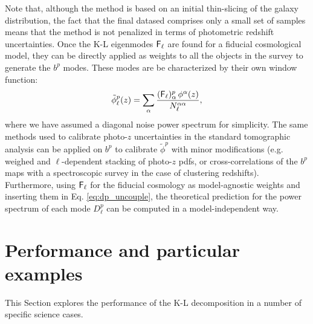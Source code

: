 \documentclass[twocolumn,amsfont,amssymb,amsmath, showpacs,balancelastpage, nofootinbib]{revtex4-1}
\begin{document}
    Note that, although the method is based on an initial thin-slicing of the galaxy distribution, the fact that the final datased comprises only a small set of samples means that the method is not penalized in terms of photometric redshift uncertainties. Once the K-L eigenmodes ${\sf F}_\ell$ are found for a fiducial cosmological model, they can be directly applied as weights to all the objects in the survey to generate the $b^p$ modes. These modes are be characterized by their own window function:
    \begin{equation}
     \tilde{\phi}_\ell^p(z)=\sum_\alpha \frac{({\sf F}_\ell)^p_\alpha\,\phi^\alpha(z)}{N^{\alpha\alpha}_\ell},
    \end{equation}
    where we have assumed a diagonal noise power spectrum for simplicity.
    The same methods used to calibrate photo-$z$ uncertainties in the standard tomographic analysis can be applied on $b^p$ to calibrate $\tilde{\phi}^p$ with minor modifications (e.g. weighed and $\ell$-dependent stacking of photo-$z$ pdfs, or cross-correlations of the $b^p$ maps with a spectroscopic survey in the case of clustering redshifts). Furthermore, using ${\sf F}_\ell$ for the fiducial cosmology as model-agnostic weights and inserting them in Eq. \ref{eq:dp_uncouple}, the theoretical prediction for the power spectrum of each mode $D^p_\ell$ can be computed in a model-independent way.

\section{Performance and particular examples}\label{sec:results}
  This Section explores the performance of the K-L decomposition in a number of specific science cases.
  
\end{document}
